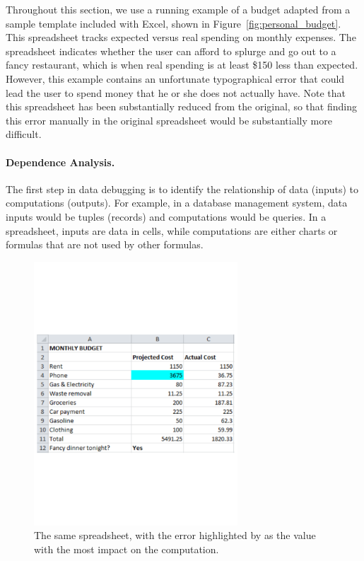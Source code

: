 Throughout this section, we use a running example of a budget adapted
from a sample template included with Excel, shown in
Figure~\ref{fig:personal_budget}. This spreadsheet tracks expected
versus real spending on monthly expenses. The spreadsheet indicates
whether the user can afford to splurge and go out to a fancy
restaurant, which is when real spending is at least \$150 less than
expected. However, this example contains an unfortunate typographical
error that could lead the user to spend money that he or she does not
actually have. Note that this spreadsheet has been substantially
reduced from the original, so that finding this error manually in the
original spreadsheet would be substantially more difficult.

\paragraph{Dependence Analysis.}
The first step in data debugging is to identify the relationship of
data (inputs) to computations (outputs). For example, in a database
management system, data inputs would be tuples (records) and computations would
be queries. In a spreadsheet, inputs are data in cells, while
computations are either charts or formulas that are not used by other formulas.

\begin{figure}[!t]
\centering
\includegraphics[width=3in]{overview-example-highlighted}
  \caption{The same spreadsheet, with the error highlighted by \checkcell{} as the value with the most impact on the computation.\label{fig:personal_budget_highlighted}}
\end{figure}

